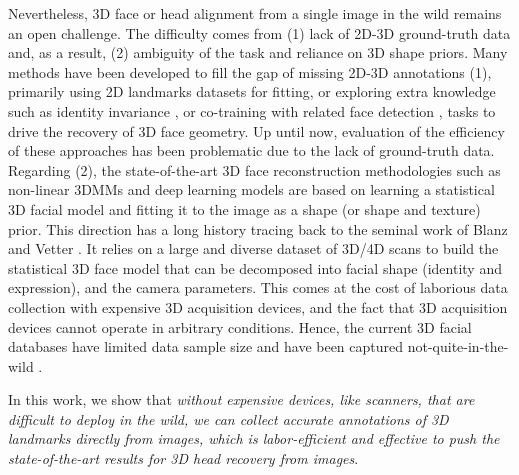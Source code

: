 \documentclass[10pt,twocolumn,letterpaper]{article}
\begin{document}
Nevertheless, 3D face or head alignment from a single image in the wild remains an open challenge. The difficulty comes from (1) lack of 2D-3D ground-truth data and, as a result, (2) ambiguity of the task and reliance on 3D shape priors. 
Many methods have been developed to fill the gap of missing 2D-3D annotations (1), primarily using 2D landmarks datasets for fitting, or exploring extra knowledge such as identity invariance \cite{RingNet}, or co-training with related face detection \cite{RetinaFace}, \cite{FacePoseNet} tasks to drive the recovery of 3D face geometry. 
Up until now, evaluation of the efficiency of these approaches has been problematic due to the lack of ground-truth data. Regarding (2), the state-of-the-art 3D face reconstruction methodologies such as non-linear 3DMMs and deep learning models \cite{KF-ITW, 7780967, LargeScale3DMM, FLAME, Ploumpis_2019_CVPR} are based on learning a statistical 3D facial model and fitting it to the image as a shape (or shape and texture) prior. 
This direction has a long history tracing back to the seminal work of Blanz and Vetter \cite{3dmm}. 
It relies on a large and diverse dataset of 3D/4D scans to build the statistical 3D face model that can be decomposed into facial shape (identity and expression), and the camera parameters. 
This comes at the cost of laborious data collection with expensive 3D acquisition devices, and the fact that 3D acquisition devices cannot operate in arbitrary conditions. 
Hence, the current 3D facial databases have limited data sample size and have been captured not-quite-in-the-wild \cite{RingNet}. 

In this work, we show that \emph{without expensive devices, like scanners, that are difficult to deploy in the wild, we can collect accurate annotations of 3D landmarks directly from images, which is labor-efficient and effective to push the state-of-the-art results for 3D head recovery from images}. 
\end{document}
